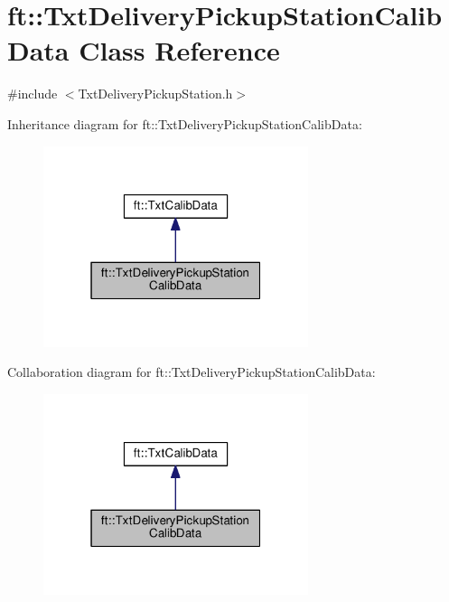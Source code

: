 \hypertarget{classft_1_1_txt_delivery_pickup_station_calib_data}{}\section{ft\+:\+:Txt\+Delivery\+Pickup\+Station\+Calib\+Data Class Reference}
\label{classft_1_1_txt_delivery_pickup_station_calib_data}


{\ttfamily \#include $<$Txt\+Delivery\+Pickup\+Station.\+h$>$}



Inheritance diagram for ft\+:\+:Txt\+Delivery\+Pickup\+Station\+Calib\+Data\+:
\nopagebreak
\begin{figure}[H]
\begin{center}
\leavevmode
\includegraphics[width=220pt]{classft_1_1_txt_delivery_pickup_station_calib_data__inherit__graph}
\end{center}
\end{figure}


Collaboration diagram for ft\+:\+:Txt\+Delivery\+Pickup\+Station\+Calib\+Data\+:
\nopagebreak
\begin{figure}[H]
\begin{center}
\leavevmode
\includegraphics[width=220pt]{classft_1_1_txt_delivery_pickup_station_calib_data__coll__graph}
\end{center}
\end{figure}
